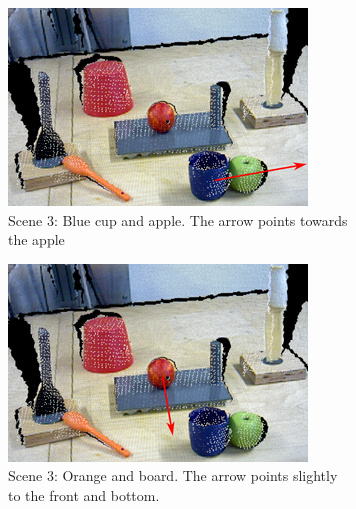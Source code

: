 \begin{figure}[]
  \centering
  \begin{subfigure}[t]{0.475\textwidth}
    \includegraphics[width=\textwidth]{./figures/sec/geometrical_reasoning/affordance_arrow_scene5_1.jpg}
    \caption{Scene 3: Blue cup and apple. The arrow points towards the apple}
    \label{fig:sec_enriched_geometricalreasoning_experiments_scene3_1}
  \end{subfigure}
  \hfill
  \begin{subfigure}[t]{0.475\textwidth}
    \includegraphics[width=\textwidth]{./figures/sec/geometrical_reasoning/affordance_arrow_scene5_2.jpg}
    \caption{Scene 3: Orange and board. The arrow points slightly to the front and bottom.}
    \label{fig:sec_enriched_geometricalreasoning_experiments_scene3_2}
  \end{subfigure}\\%
  \begin{subfigure}[t]{0.475\textwidth}

\end{subfigure}
\end{figure}
